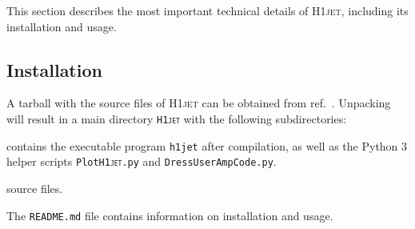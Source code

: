 \documentclass[12pt]{article}
\begin{document}
This section describes the most important technical details of
\textsc{H1jet}, including its installation and usage.

\subsection{Installation} 
A tarball with the source files of \textsc{H1jet} can be obtained from
ref.~\cite{h1jet}. Unpacking will result in a main directory
\texttt{\textsc{H1jet}} with the following subdirectories:
\begin{description}[labelindent=\parindent, labelwidth =\widthof{\bfseries9999}, leftmargin = !]
	\item[\texttt{bin} :] contains the executable program \texttt{h1jet} after compilation, as well as the Python 3 helper scripts \texttt{Plot\textsc{H1jet}.py} and \texttt{DressUserAmpCode.py}. 
	\item[\texttt{src} :] source files. 
\end{description}
The \texttt{README.md} file contains information on installation and usage. \\
\end{document}
